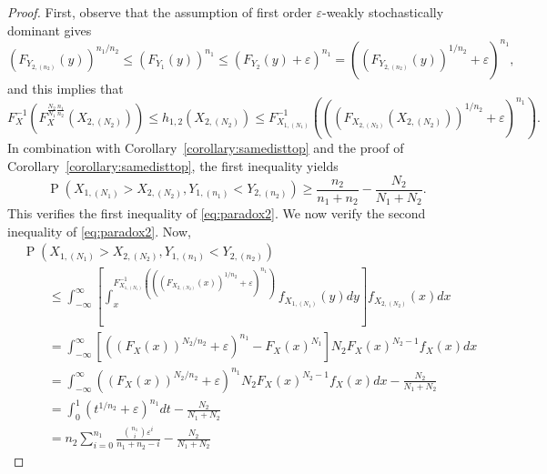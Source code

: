 \documentclass[12pt]{article}
\DeclareMathOperator*{\Prob}{P}
\begin{document}
\begin{proof}
First, observe that the assumption of first order $\varepsilon$-weakly stochastically dominant gives 
$$
  \left(F_{Y_{2,(n_2)}}(y)\right)^{n_1/n_2} \leq \left(F_{Y_1}(y)\right)^{n_1} \leq \left(F_{Y_2}(y) + \varepsilon\right)^{n_1} = \left(\left(F_{Y_{2,(n_2)}}(y)\right)^{1/n_2} + \varepsilon\right)^{n_1},
$$
and this implies that 
$$
   F_X^{-1}\left(F_X^{\frac{N_2}{N_1}\frac{n_1}{n_2}}(X_{2,(N_2)})\right) \leq 
   h_{1,2}(X_{2,(N_2)}) \leq 
   F_{X_{1,(N_1)}}^{-1}\left(  \left(\left(F_{X_{2,(N_2)}}(X_{2,(N_2)})\right)^{1/n_2} + \varepsilon\right)^{n_1}  \right).
$$
In combination with Corollary~\ref{corollary:samedisttop} and the proof of Corollary~\ref{corollary:samedisttop}, the first inequality yields  
$$
  \Prob\left(X_{1,(N_1)} > X_{2,(N_2)}, Y_{1,(n_1)} < Y_{2,(n_2)}\right) 
  \geq \frac{n_2}{n_1 + n_2} - \frac{N_2}{N_1 + N_2}.
$$
This verifies the first inequality of \eqref{eq:paradox2}. We now verify the second inequality of \eqref{eq:paradox2}. Now,
\begin{align*}
  &\Prob\left(X_{1,(N_1)} > X_{2,(N_2)}, Y_{1,(n_1)} < Y_{2,(n_2)}\right) \\
  &\qquad \leq \int_{-\infty}^{\infty}\left[\int_{x}^{F_{X_{1,(N_1)}}^{-1}\left(  \left(\left(F_{X_{2,(N_2)}}(x)\right)^{1/n_2} + \varepsilon\right)^{n_1}  \right)} f_{X_{1,(N_1)}}(y) dy\right] f_{X_{2,(N_2)}}(x) dx \\
  &\qquad = \int_{-\infty}^{\infty}\left[\left(\left(F_{X}(x)\right)^{N_2/n_2} + \varepsilon\right)^{n_1} - F_{X}(x)^{N_1}\right] N_2F_{X}(x)^{N_2-1} f_X(x) dx \\
  &\qquad = \int_{-\infty}^{\infty}\left(\left(F_{X}(x)\right)^{N_2/n_2} + \varepsilon\right)^{n_1}N_2F_{X}(x)^{N_2-1} f_X(x) dx - \frac{N_2}{N_1 + N_2} \\
  &\qquad = \int_{0}^{1}\left(t^{1/n_2} + \varepsilon\right)^{n_1} dt - \frac{N_2}{N_1 + N_2} \\
  &\qquad = n_2\sum_{i=0}^{n_1} \frac{{n_1 \choose i}\varepsilon^i}{n_1+n_2-i}- \frac{N_2}{N_1 + N_2}
\end{align*}


\end{proof}
\end{document}
